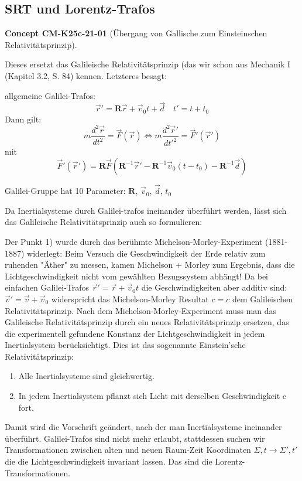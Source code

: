 \documentclass[10pt, letterpaper]{article}
\newcommand{\CustomHeading}[3]{%
  \par\medskip\noindent%
  \textbf{#1 #2} \textnormal{(#3)}.\enskip%
}
\newenvironment{CONC}[2]{\CustomHeading{Concept}{#1}{#2}}{}
\begin{document}
\subsection{SRT und Lorentz-Trafos}

\begin{CONC}{CM-K25c-21-01}{Übergang von Gallische zum Einsteinschen Relativitätsprinzip}
Dieses ersetzt das Galileische Relativitätsprinzip (das wir schon aus Mechanik I (Kapitel 3.2, S. 84) kennen. Letzteres besagt:


allgemeine Galilei-Trafos: 
$$\vec{r}' = \mathbf{R}\vec{r} + \vec{v}_0t + \vec{d} \quad t' = t + t_0$$
Dann gilt:
\[m\frac{d^2\vec{r}}{dt^2} = \vec{F}(\vec{r}) \Leftrightarrow m\frac{d^2\vec{r}'}{dt'^2} = \vec{F}'(\vec{r}')\]
mit 
$$\vec{F}'(\vec{r}') = \mathbf{R}\vec{F}(\mathbf{R}^{-1}\vec{r}' - \mathbf{R}^{-1}\vec{v}_0(t-t_0) - \mathbf{R}^{-1}\vec{d})$$

Galilei-Gruppe hat 10 Parameter: $\mathbf{R}$, $\vec{v}_0$, $\vec{d}$, $t_0$

Da Inertialsysteme durch Galilei-trafos ineinander überführt werden, lässt sich das Galileische Relativitätsprinzip auch so formulieren:


Der Punkt 1) wurde durch das berühmte Michelson-Morley-Experiment (1881-1887) widerlegt: Beim Versuch die Geschwindigkeit der Erde relativ zum ruhenden "Äther" zu messen, kamen Michelson + Morley zum Ergebnis, dass die Lichtgeschwindigkeit nicht vom gewählten Bezugssystem abhängt! Da bei einfachen Galilei-Trafos $\vec{r}' = \vec{r} + \vec{v}_0t$ die Geschwindigkeiten aber additiv sind: $\vec{v}' = \vec{v} + \vec{v}_0$ widerspricht das Michelson-Morley Resultat $c = c$ dem Galileischen Relativitätsprinzip.
Nach dem Michelson-Morley-Experiment muss man das Galileische Relativitätsprinzip durch ein neues Relativitätsprinzip ersetzen, das die experimentell gefundene Konstanz der Lichtgeschwindigkeit in jedem Inertialsystem berücksichtigt. Dies ist das sogenannte Einstein'sche Relativitätsprinzip:

\begin{enumerate}
\item Alle Inertialsysteme sind gleichwertig.
\item In jedem Inertialsystem pflanzt sich Licht mit derselben Geschwindigkeit c fort.
\end{enumerate}

Damit wird die Vorschrift geändert, nach der man Inertialsysteme ineinander überführt. Galilei-Trafos sind nicht mehr erlaubt, stattdessen suchen wir Transformationen zwischen alten und neuen Raum-Zeit Koordinaten $\Sigma, t \to \Sigma', t'$ die die Lichtgeschwindigkeit invariant lassen. Das sind die Lorentz-Transformationen.
\end{CONC}
\end{document}
